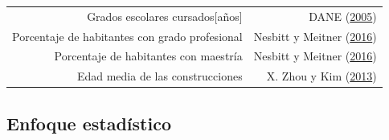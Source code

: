 \documentclass[12pt,a4paper,openany]{book}
\theoremstyle{definition}
\theoremstyle{definition}
\theoremstyle{definition}
\theoremstyle{remark}
\begin{document}
\begin{longtable}[]{@{}rr@{}}
\begin{minipage}[t]{0.57\columnwidth}
Grados escolares cursados{[}años{]}\strut
\end{minipage} & \begin{minipage}[t]{0.31\columnwidth}\raggedleft\strut
DANE (\protect\hyperlink{ref-censo_sistema_dane}{2005})\strut
\end{minipage}\tabularnewline
\begin{minipage}[t]{0.57\columnwidth}\raggedleft\strut
Porcentaje de habitantes con grado profesional\strut
\end{minipage} & \begin{minipage}[t]{0.31\columnwidth}\raggedleft\strut
Nesbitt y Meitner
(\protect\hyperlink{ref-nesbitt_exploring_2016}{2016})\strut
\end{minipage}\tabularnewline
\begin{minipage}[t]{0.57\columnwidth}\raggedleft\strut
Porcentaje de habitantes con maestría\strut
\end{minipage} & \begin{minipage}[t]{0.31\columnwidth}\raggedleft\strut
Nesbitt y Meitner
(\protect\hyperlink{ref-nesbitt_exploring_2016}{2016})\strut
\end{minipage}\tabularnewline
\begin{minipage}[t]{0.57\columnwidth}\raggedleft\strut
Edad media de las construcciones\strut
\end{minipage} & \begin{minipage}[t]{0.31\columnwidth}\raggedleft\strut
X. Zhou y Kim (\protect\hyperlink{ref-zhou_social_2013}{2013})\strut
\end{minipage}\tabularnewline
\bottomrule
\end{longtable}

\subsection{Enfoque estadístico}\label{enfoque-estaduxedstico}
\end{document}
